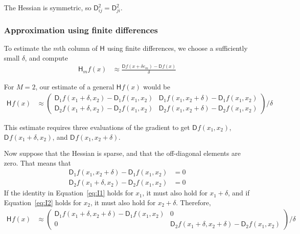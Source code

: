 \documentclass[jss]{jss}\usepackage[]{graphicx}\usepackage[]{color}
\newcommand{\parD}[3]{\mathsf{D}^{#1}_{#2}#3}
\newcommand{\hess}[2]{\mathsf{H}_{#1}#2}
\begin{document}
The Hessian is symmetric, so $\parD{2}{ij}{}=\parD{2}{ji}{}$.

\subsubsection[Approximation using finite differences]{Approximation using finite differences} 

To estimate the $m$th column of $\hess{}{}$ using finite differences, we choose a
sufficiently small $\delta$, and compute
\begin{align}
  \label{eq:1}
  \hess{m}{f(x)}&\approx\frac{\parD{}{}{f(x+\delta e_m)}-\parD{}{}{f(x)}}{\delta}
\end{align}

For $M=2$, our estimate of a general $\hess{}{f(x)}$ would be
\begin{align}
  \label{eq:FDhess2}
  \hess{}{f(x)}&\approx
  \begin{pmatrix}
    \parD{}{1}{f(x_1+\delta, x_2)}-\parD{}{1}{f(x_1,x_2)}& \parD{}{1}{f(x_1,x_2+\delta)}-\parD{}{1}{f(x_1,x_2)}\\
        \parD{}{2}{f(x_1+\delta, x_2)}-\parD{}{2}{f(x_1,x_2)}&  \parD{}{2}{f(x_1,x_2+\delta)}-\parD{}{2}{f(x_1,x_2)}
    \end{pmatrix}/\delta
\end{align}

This estimate requires three evaluations of the gradient to get
${\parD{}{}{f(x_1,x_2)}}$, ${\parD{}{}{f(x_1+\delta,x_2)}}$, and
${\parD{}{}{f(x_1,x_2+\delta)}}$.

Now suppose that the Hessian is sparse, and that the off-diagonal
elements are zero.  That means that
\begin{align}
  \parD{}{1}{f(x_1,x_2+\delta)}-\parD{}{1}{f(x_1,x_2)}&=0\label{eq:I1}\\
    \parD{}{2}{f(x_1+\delta,x_2)}-\parD{}{2}{f(x_1,x_2)}&=0\label{eq:I2}
\end{align}
If the identity in Equation~\ref{eq:I1} holds for $x_1$, it must also
hold for $x_1+\delta$, and if Equation~\ref{eq:I2} holds for $x_2$, it
must also hold for $x_2+\delta$.  Therefore,
\begin{align}
  \label{eq:FDhess2sp}
  \hess{}{f(x)}&\approx
  \begin{pmatrix}
    \parD{}{1}{f(x_1+\delta, x_2+\delta)}-\parD{}{1}{f(x_1,x_2)}&0\\
        0&  \parD{}{2}{f(x_1+\delta,x_2+\delta)}-\parD{}{2}{f(x_1,x_2)}
    \end{pmatrix}/\delta
\end{align}
\end{document}
